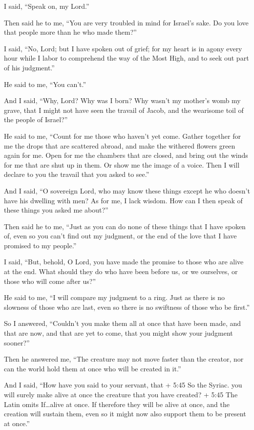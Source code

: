  I said, ``Speak on, my Lord.''

Then said he to me, ``You are very troubled in mind for Israel's sake.
Do you love that people more than he who made them?''

 I said, ``No, Lord; but I have spoken out of grief; for my
heart is in agony every hour while I labor to comprehend the way of the
Most High, and to seek out part of his judgment.''

 He said to me, ``You can't.''

And I said, ``Why, Lord? Why was I born? Why wasn't my mother's womb my
grave, that I might not have seen the travail of Jacob, and the
wearisome toil of the people of Israel?''

 He said to me, ``Count for me those who haven't yet come.
Gather together for me the drops that are scattered abroad, and make the
withered flowers green again for me.  Open for me the
chambers that are closed, and bring out the winds for me that are shut
up in them. Or show me the image of a voice. Then I will declare to you
the travail that you asked to see.''

 And I said, ``O sovereign Lord, who may know these things
except he who doesn't have his dwelling with men?  As for
me, I lack wisdom. How can I then speak of these things you asked me
about?''

 Then said he to me, ``Just as you can do none of these
things that I have spoken of, even so you can't find out my judgment, or
the end of the love that I have promised to my people.''

 I said, ``But, behold, O Lord, you have made the promise
to those who are alive at the end. What should they do who have been
before us, or we ourselves, or those who will come after us?''

 He said to me, ``I will compare my judgment to a ring.
Just as there is no slowness of those who are last, even so there is no
swiftness of those who be first.''

 So I answered, ``Couldn't you make them all at once that
have been made, and that are now, and that are yet to come, that you
might show your judgment sooner?''

 Then he answered me, ``The creature may not move faster
than the creator, nor can the world hold them at once who will be
created in it.''

 And I said, ``How have you said to your servant, that +
5:45 So the Syriac. you will surely make alive at once the creature that
you have created? + 5:45 The Latin omits If\ldots alive at once. If
therefore they will be alive at once, and the creation will sustain
them, even so it might now also support them to be present at once.''

